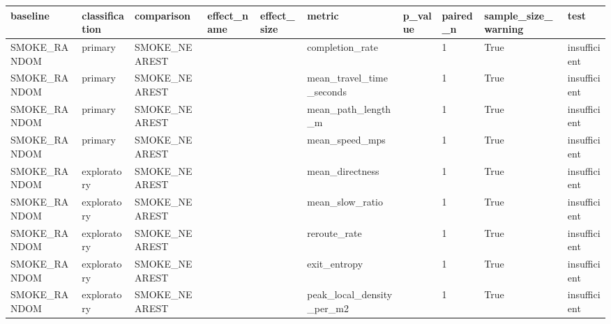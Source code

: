 \begin{tabular}{llllllllll}
\hline
baseline & classification & comparison & effect_name & effect_size & metric & p_value & paired_n & sample_size_warning & test \\
\hline
SMOKE\_RANDOM & primary & SMOKE\_NEAREST &  &  & completion\_rate &  & 1 & True & insufficient \\
SMOKE\_RANDOM & primary & SMOKE\_NEAREST &  &  & mean\_travel\_time\_seconds &  & 1 & True & insufficient \\
SMOKE\_RANDOM & primary & SMOKE\_NEAREST &  &  & mean\_path\_length\_m &  & 1 & True & insufficient \\
SMOKE\_RANDOM & primary & SMOKE\_NEAREST &  &  & mean\_speed\_mps &  & 1 & True & insufficient \\
SMOKE\_RANDOM & exploratory & SMOKE\_NEAREST &  &  & mean\_directness &  & 1 & True & insufficient \\
SMOKE\_RANDOM & exploratory & SMOKE\_NEAREST &  &  & mean\_slow\_ratio &  & 1 & True & insufficient \\
SMOKE\_RANDOM & exploratory & SMOKE\_NEAREST &  &  & reroute\_rate &  & 1 & True & insufficient \\
SMOKE\_RANDOM & exploratory & SMOKE\_NEAREST &  &  & exit\_entropy &  & 1 & True & insufficient \\
SMOKE\_RANDOM & exploratory & SMOKE\_NEAREST &  &  & peak\_local\_density\_per\_m2 &  & 1 & True & insufficient \\
\hline
\end{tabular}

